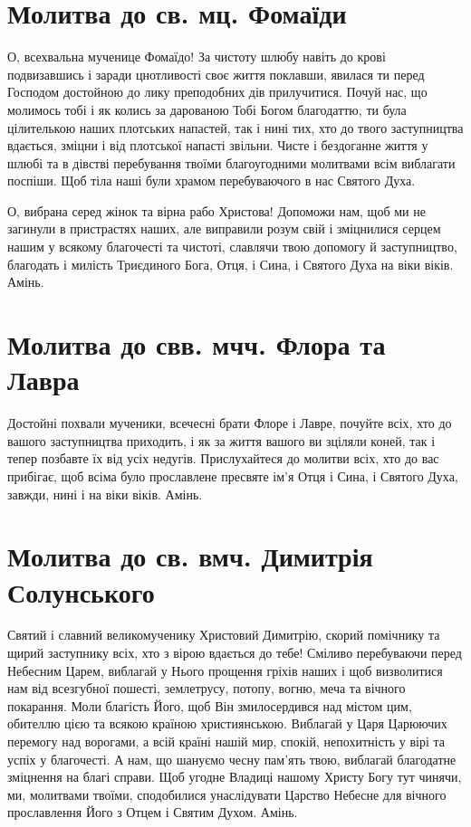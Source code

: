 \documentclass[chapters.tex]{subfiles}
\begin{document}
\section{Молитва до св. мц. Фомаїди}
О, всехвальна мученице Фомаїдо! За чистоту шлюбу навіть до крові подвизавшись і заради цнотливості своє життя поклавши, явилася ти перед Господом достойною до лику преподобних дів прилучитися. Почуй нас, що молимось тобі і як колись за дарованою Тобі Богом благодаттю, ти була цілителькою наших плотських напастей, так і нині тих, хто до твого заступництва вдається, зміцни і від плотської напасті звільни. Чисте і бездоганне життя у шлюбі та в дівстві перебування твоїми благоугодними молитвами всім виблагати поспіши. Щоб тіла наші були храмом перебуваючого в нас Святого Духа.

О, вибрана серед жінок та вірна рабо Христова! Допоможи нам, щоб ми не загинули в пристрастях наших, але виправили розум свій і зміцнилися серцем нашим у всякому благочесті та чистоті, славлячи твою допомогу й заступництво, благодать і милість Триєдиного Бога, Отця, і Сина, і Святого Духа на віки віків. Амінь.

\section{Молитва до свв. мчч. Флора та Лавра}
Достойні похвали мученики, всечесні брати Флоре і Лавре, почуйте всіх, хто до вашого заступництва приходить, і як за життя вашого ви зціляли коней, так і тепер позбавте їх від усіх недугів. Прислухайтеся до молитви всіх, хто до вас прибігає, щоб всіма було прославлене пресвяте ім’я Отця і Сина, і Святого Духа, завжди, нині і на віки віків. Амінь.

\section{Молитва до св. вмч. Димитрія Солунського}
Святий і славний великомученику Христовий Димитрію, скорий помічнику та щирий заступнику всіх, хто з вірою вдається до тебе! Сміливо перебуваючи перед Небесним Царем, виблагай у Нього прощення гріхів наших і щоб визволитися нам від всезгубної пошесті, землетрусу, потопу, вогню, меча та вічного покарання. Моли благість Його, щоб Він змилосердився над містом цим, обителлю цією та всякою країною християнською. Виблагай у Царя Царюючих перемогу над ворогами, а всій країні нашій мир, спокій, непохитність у вірі та успіх у благочесті. А нам, що шануємо чесну пам’ять твою, виблагай благодатне зміцнення на благі справи. Щоб угодне Владиці нашому Христу Богу тут чинячи, ми, молитвами твоїми, сподобилися унаслідувати Царство Небесне для вічного прославлення Його з Отцем і Святим Духом. Амінь.
\end{document}

